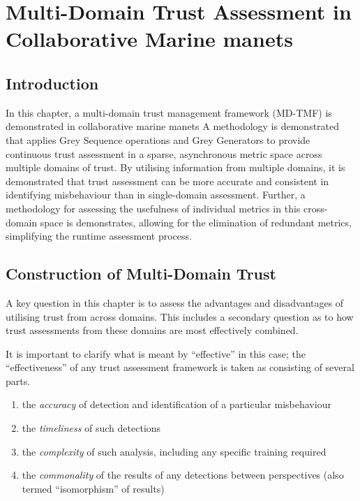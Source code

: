 \def\ChapterTitle{Multi-Domain Trust Assessment in Collaborative Marine \gls{manet}s}

\chapter{\ChapterTitle}
\label{Chapter\thechapter}

\section{Introduction}

In this chapter, a multi-domain trust management framework (MD-TMF) is demonstrated in collaborative marine \glspl{manet}
A methodology is demonstrated that applies Grey Sequence operations and Grey Generators to provide continuous trust assessment in a sparse, asynchronous metric space across multiple domains of trust.
By utilising information from multiple domains, it is demonstrated that trust assessment can be more accurate and consistent in identifying misbehaviour than in single-domain assessment.
Further, a methodology for assessing the usefulness of individual metrics in this cross-domain space is demonstrates, allowing for the elimination of redundant metrics, simplifying the runtime assessment process.

\section{Construction of Multi-Domain Trust}

A key question in this chapter is to assess the advantages and disadvantages of utilising trust from across domains. 
This includes a secondary question as to how trust assessments from these domains are most effectively combined. 

It is important to clarify what is meant by ``effective'' in this case; the ``effectiveness'' of any trust assessment framework is taken as consisting of several parts.

\begin{enumerate}
  \item the \emph{accuracy} of detection and identification of a particular misbehaviour
  \item the \emph{timeliness} of such detections
  \item the \emph{complexity} of such analysis, including any specific training required
  \item the \emph{commonality} of the results of any detections between perspectives (also termed ``isomorphism'' of results)
\end{enumerate}



